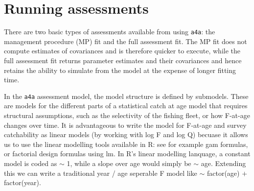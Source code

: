\documentclass[a4paper,english,10pt]{article}\usepackage[]{graphicx}\usepackage[]{color}
\begin{document}
\pagebreak
\section{Running assessments}

There are two basic types of assessments available from using \texttt{a4a}: the management procedure (MP) fit and the full assessment fit.  The MP fit does not compute estimates of covariances and is therefore quicker to execute, while the full assessment fit returns parameter estimates and their covariances and hence retains the ability to simulate from the model at the expense of longer fitting time.

In the \texttt{a4a} assessment model, the model structure is defined by submodels.  These are models for the different parts of a statistical catch at age model that requires structural assumptions, such as the selectivity of the fishing fleet, or how F-at-age changes over time.  It is advantageous to write the model for F-at-age and survey catchability as linear models (by working with log F and log Q) becuase it allows us to use the linear modelling tools available in R:  see for example gam formulas, or factorial design formulas using lm.  In R's linear modelling lanquage, a constant model is coded as $\sim$ 1, while a slope over age would simply be $\sim$ age.  Extending this we can write a traditional year / age seperable F model like $\sim$ factor(age) $+$ factor(year).






\end{document}
